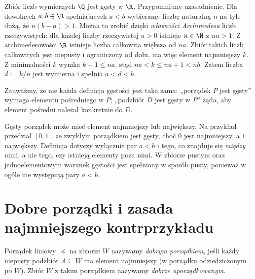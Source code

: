 \begin{przyklad}
Zbiór liczb wymiernych $\Q$ jest gęsty w $\R$.
Przypomnijmy uzasadnienie. Dla dowolnych $a,b\in\R$
spełniających $a<b$ wybieramy liczbę
naturalną $n$ na tyle dużą, że $n(b-a)>1$.
Można to zrobić dzięki \emph{własności Archimedesa}
liczb rzeczywistych: dla każdej liczby rzeczywistej
$u>0$ istnieje $n\in\N$ z $nu>1$.
Z archimedesowości $\R$ istnieje liczba całkowita większa
od $na$. Zbiór takich liczb całkowitych jest niepusty
i ograniczony od dołu, ma więc element najmniejszy $k$.
Z minimalności $k$ wynika $k-1\le na$, stąd
$na<k\le na+1<nb$.
Zatem liczba $d:=k/n$ jest wymierna i spełnia $a<d<b$.

Zauważmy, że nie każda definicja gęstości jest taka sama:
„porządek $P$ jest gęsty” wymaga elementu pośredniego w $P$;
„podzbiór $D$ jest gęsty w $P$” żąda, aby element pośredni
należał konkretnie do $D$.
\end{przyklad}

\begin{uwaga}
Gęsty porządek może mieć element najmniejszy lub największy.
Na przykład przedział $[0,1]$ ze zwykłym porządkiem jest
gęsty, choć $0$ jest najmniejszy, a $1$ największy.
Definicja dotyczy wyłącznie par $a<b$ i tego, co
znajduje się \emph{między} nimi, a nie tego, czy
istnieją elementy poza nimi. W zbiorze pustym oraz
jednoelementowym warunek gęstości jest spełniony
w sposób pusty, ponieważ w ogóle nie występują pary $a<b$.
\end{uwaga}



\section{Dobre porządki i zasada najmniejszego kontrprzykładu}
\label{sec:order-well-order}
\begin{definicja}\label{def:well-order}
Porządek liniowy $\preceq$ na zbiorze $W$ nazywamy
\emph{dobrym porządkiem}, jeśli każdy niepusty podzbiór
$A\subseteq W$ ma element najmniejszy (w porządku
odziedziczonym po $W$). Zbiór $W$ z takim porządkiem
nazywamy \emph{dobrze uporządkowanym}.
\end{definicja}

